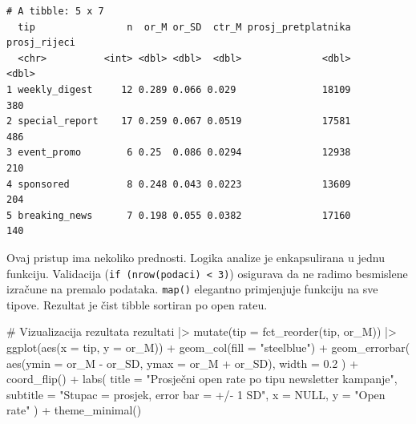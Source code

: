 \documentclass[
  croatian,
  letterpaper,
  DIV=11,
  numbers=noendperiod]{scrartcl}
\newenvironment{Shaded}{\begin{snugshade}}{\end{snugshade}}
\newcommand{\AttributeTok}[1]{\textcolor[rgb]{0.40,0.45,0.13}{#1}}
\newcommand{\CommentTok}[1]{\textcolor[rgb]{0.37,0.37,0.37}{#1}}
\newcommand{\ConstantTok}[1]{\textcolor[rgb]{0.56,0.35,0.01}{#1}}
\newcommand{\FloatTok}[1]{\textcolor[rgb]{0.68,0.00,0.00}{#1}}
\newcommand{\FunctionTok}[1]{\textcolor[rgb]{0.28,0.35,0.67}{#1}}
\newcommand{\NormalTok}[1]{\textcolor[rgb]{0.00,0.23,0.31}{#1}}
\newcommand{\SpecialCharTok}[1]{\textcolor[rgb]{0.37,0.37,0.37}{#1}}
\newcommand{\StringTok}[1]{\textcolor[rgb]{0.13,0.47,0.30}{#1}}
\begin{document}
\begin{verbatim}
# A tibble: 5 x 7
  tip                n  or_M or_SD  ctr_M prosj_pretplatnika prosj_rijeci
  <chr>          <int> <dbl> <dbl>  <dbl>              <dbl>        <dbl>
1 weekly_digest     12 0.289 0.066 0.029               18109          380
2 special_report    17 0.259 0.067 0.0519              17581          486
3 event_promo        6 0.25  0.086 0.0294              12938          210
4 sponsored          8 0.248 0.043 0.0223              13609          204
5 breaking_news      7 0.198 0.055 0.0382              17160          140
\end{verbatim}

Ovaj pristup ima nekoliko prednosti. Logika analize je enkapsulirana u
jednu funkciju. Validacija (\texttt{if\ (nrow(podaci)\ \textless{}\ 3)})
osigurava da ne radimo besmislene izračune na premalo podataka.
\texttt{map()} elegantno primjenjuje funkciju na sve tipove. Rezultat je
čist tibble sortiran po open rateu.

\begin{Shaded}
\begin{Highlighting}[]
\CommentTok{\# Vizualizacija rezultata}
\NormalTok{rezultati }\SpecialCharTok{|\textgreater{}}
  \FunctionTok{mutate}\NormalTok{(}\AttributeTok{tip =} \FunctionTok{fct\_reorder}\NormalTok{(tip, or\_M)) }\SpecialCharTok{|\textgreater{}}
  \FunctionTok{ggplot}\NormalTok{(}\FunctionTok{aes}\NormalTok{(}\AttributeTok{x =}\NormalTok{ tip, }\AttributeTok{y =}\NormalTok{ or\_M)) }\SpecialCharTok{+}
  \FunctionTok{geom\_col}\NormalTok{(}\AttributeTok{fill =} \StringTok{"steelblue"}\NormalTok{) }\SpecialCharTok{+}
  \FunctionTok{geom\_errorbar}\NormalTok{(}
    \FunctionTok{aes}\NormalTok{(}\AttributeTok{ymin =}\NormalTok{ or\_M }\SpecialCharTok{{-}}\NormalTok{ or\_SD, }\AttributeTok{ymax =}\NormalTok{ or\_M }\SpecialCharTok{+}\NormalTok{ or\_SD),}
    \AttributeTok{width =} \FloatTok{0.2}
\NormalTok{  ) }\SpecialCharTok{+}
  \FunctionTok{coord\_flip}\NormalTok{() }\SpecialCharTok{+}
  \FunctionTok{labs}\NormalTok{(}
    \AttributeTok{title =} \StringTok{"Prosječni open rate po tipu newsletter kampanje"}\NormalTok{,}
    \AttributeTok{subtitle =} \StringTok{"Stupac = prosjek, error bar = +/{-} 1 SD"}\NormalTok{,}
    \AttributeTok{x =} \ConstantTok{NULL}\NormalTok{,}
    \AttributeTok{y =} \StringTok{"Open rate"}
\NormalTok{  ) }\SpecialCharTok{+}
  \FunctionTok{theme\_minimal}\NormalTok{()}
\end{Highlighting}
\end{Shaded}
\end{document}
